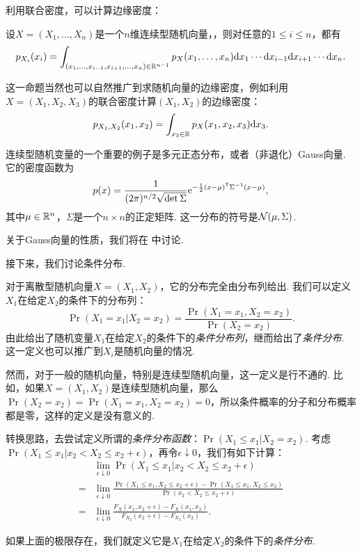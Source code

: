 利用联合密度，可以计算边缘密度：
\begin{proposition}\label{prop:continuous-marginal}
    设$X=(X_1,\dots,X_n)$是一个$n$维连续型随机向量，，则对任意的$1\leq i\leq n$，都有
    \[p_{X_i}(x_i)=\int_{(x_1,\dots,x_{i-1},x_{i+1},\dots,x_n)\in\mathbb{R}^{n-1}}p_X(x_1,\dots,x_n)\mathrm{d} x_1\cdots\mathrm{d} x_{i-1}\mathrm{d} x_{i+1}\cdots\mathrm{d} x_n.\]
\end{proposition}

这一命题当然也可以自然推广到求随机向量的边缘密度，例如利用$X=(X_1,X_2,X_3)$的联合密度计算$(X_1,X_2)$的边缘密度：
\[
    p_{X_1,X_2}(x_1,x_2) = \int_{x_3\in\mathbb{R}}p_X(x_1,x_2,x_3)\mathrm{d} x_3.
\]

连续型随机变量的一个重要的例子是多元正态分布，或者（非退化）Gauss向量. 它的密度函数为
\[p(x)=\frac{1}{(2\pi)^{n/2}\sqrt{\det\Sigma}}\mathrm{e}^{-\frac{1}{2}(x-\mu)^{\mathsf{T}}\Sigma^{-1}(x-\mu)},\]
其中$\mu\in\mathbb{R}^n$，$\Sigma$是一个$n\times n$的正定矩阵. 这一分布的符号是$\mathcal{N}(\mu,\Sigma)$. 

关于Gauss向量的性质，我们将在 中讨论. 

接下来，我们讨论条件分布. 

对于离散型随机向量$X=(X_1,X_2)$，它的分布完全由分布列给出. 我们可以定义$X_1$在给定$X_2$的条件下的分布列：
\[\Pr(X_1=x_1|X_2=x_2)=\frac{\Pr(X_1=x_1,X_2=x_2)}{\Pr(X_2=x_2)}.\]
由此给出了随机变量$X_1$在给定$X_2$的条件下的\emph{条件分布列}，继而给出了\emph{条件分布}. 这一定义也可以推广到$X_i$是随机向量的情况. 

然而，对于一般的随机向量，特别是连续型随机向量，这一定义是行不通的. 比如，如果$X=(X_1,X_2)$是连续型随机向量，那么 $\Pr(X_2=x_2)=\Pr(X_1=x_1,X_2=x_2)=0$，所以条件概率的分子和分布概率都是零，这样的定义是没有意义的. 

转换思路，去尝试定义所谓的\emph{条件分布函数}：$\Pr(X_1\leq x_1|X_2=x_2)$. 考虑$\Pr(X_1\leq x_1|x_2< X_2\leq x_2+\epsilon)$，再令$\epsilon\downarrow 0$，我们有如下计算：
\begin{align*}
    &\lim_{\epsilon\downarrow 0}\Pr(X_1\leq x_1|x_2< X_2\leq x_2+\epsilon) \\
    =&\lim_{\epsilon\downarrow 0}\frac{\Pr(X_1\leq x_1,X_2\leq x_2+\epsilon)-\Pr(X_1\leq x_1,X_2\leq x_2)}{\Pr(x_2< X_2\leq x_2+\epsilon)}\\
    =&\lim_{\epsilon\downarrow 0}\frac{F_X(x_1,x_2+\epsilon)-F_X(x_1,x_2)}{F_{X_2}(x_2+\epsilon)-F_{X_2}(x_2)}.
\end{align*}

如果上面的极限存在，我们就定义它是$X_1$在给定$X_2$的条件下的\emph{条件分布}. 


